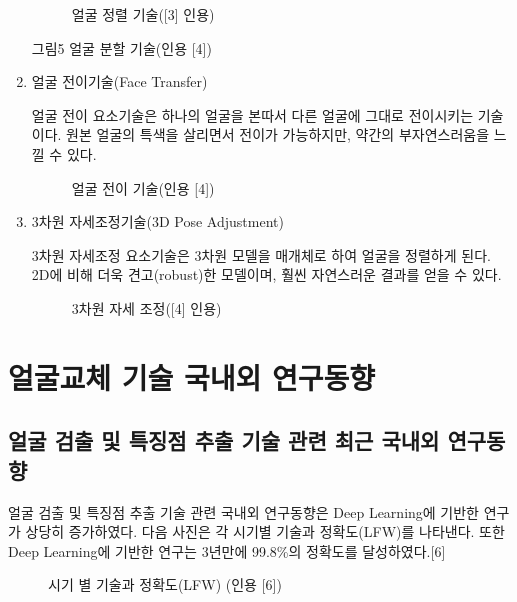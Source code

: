 \documentclass{oblivoir}
\begin{document}
\begin{enumerate}
    \begin{figure}[h!]
        \centering
        \caption{얼굴 정렬 기술([3] 인용)}
    \end{figure}

    그림5  얼굴 분할 기술(인용 [4])

    \item 얼굴 전이기술(Face Transfer)

    얼굴 전이 요소기술은 하나의 얼굴을 본따서 다른 얼굴에 그대로 전이시키는 기술이다. 원본 얼굴의 특색을 살리면서 전이가 가능하지만, 약간의 부자연스러움을 느낄 수 있다.
    \begin{figure}[h!]
        \centering
        \caption{얼굴 전이 기술(인용 [4])}
    \end{figure}

    \item  3차원 자세조정기술(3D Pose Adjustment)

    3차원 자세조정 요소기술은 3차원 모델을 매개체로 하여 얼굴을 정렬하게 된다. 2D에 비해 더욱 견고(robust)한 모델이며, 훨씬 자연스러운 결과를 얻을 수 있다. 

    \begin{figure}[h!]
        \centering
        \caption{ 3차원 자세 조정([4] 인용)}
    \end{figure}
\end{enumerate}

\section{얼굴교체 기술 국내외 연구동향}

\subsection{얼굴 검출 및 특징점 추출 기술 관련 최근 국내외 연구동향}

얼굴 검출 및 특징점 추출 기술 관련 국내외 연구동향은 Deep Learning에 기반한 연구가 상당히 증가하였다. 다음 사진은 각 시기별 기술과 정확도(LFW)를 나타낸다. 또한 Deep Learning에 기반한 연구는 3년만에 99.8\%의 정확도를 달성하였다.[6]


\begin{figure}[h!]
\centering
\caption{ 시기 별 기술과 정확도(LFW) (인용 [6])    }
\end{figure}
\end{document}
